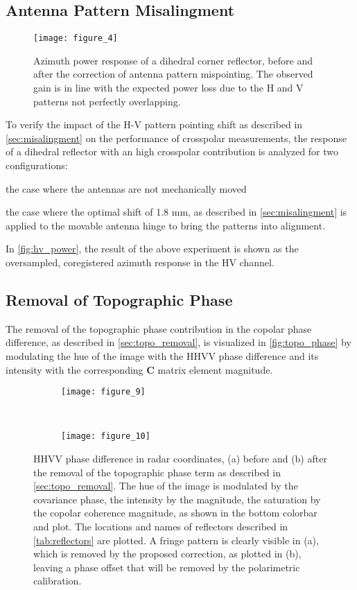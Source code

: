 \subsection{Antenna Pattern Misalingment}
\begin{figure*}[ht!]
	\centering
	\texttt{[image: figure\_4]}
	\caption{Azimuth power response of a dihedral corner reflector, before and after the correction of antenna pattern mispointing. The observed gain is in line with the expected power loss due to the H and V patterns not perfectly overlapping.}
	\label{fig:hv_power}
\end{figure*}
To verify the impact of the H-V pattern pointing shift as described in \autoref{sec:misalingment} on the performance of crosspolar measurements, the response of a dihedral reflector with an high crosspolar contribution is analyzed for two configurations:\\ \begin{enumerate*}\item the case where the antennas are not mechanically moved \item the case where the optimal shift of 1.8 mm, as described in \autoref{sec:misalingment} is applied to the movable antenna hinge to bring the patterns into alignment.\\ 
\end{enumerate*}
In \autoref{fig:hv_power}, the result of the above experiment is shown as the oversampled, coregistered azimuth response in the HV channel.
\subsection{Removal of Topographic Phase}\label{sec:topo_removal}
The removal of the topographic phase contribution in the copolar phase difference, as described in \autoref{sec:topo_removal}, is visualized in  \autoref{fig:topo_phase} by modulating the hue of the image with the HHVV phase difference and its intensity with the corresponding $\mathbf{C}$ matrix element magnitude. 
\begin{figure*}[hb]
	\centering
	\begin{subfigure}[t]{0.5\textwidth}
	\centering
	\texttt{[image: figure\_9]}
	\label{fig:topo_phase:uncorrected}
	\end{subfigure}~
	\begin{subfigure}[t]{0.5\textwidth}
	\centering
	\texttt{[image: figure\_10]}
	\label{fig:topo_phase:corrected}
	\end{subfigure}
	\caption{HHVV phase difference in radar coordinates, (a) before and (b)  after the removal of the topographic phase term as described in \autoref{sec:topo_removal}. The hue of the image is modulated by the covariance phase, the intensity by the magnitude, the saturation by the copolar coherence magnitude, as shown in the bottom colorbar and plot. The locations and names of reflectors described in \autoref{tab:reflectors} are plotted. A fringe pattern is clearly visible in (a), which is removed by the proposed correction, as plotted in (b), leaving a phase offset that will be removed by the polarimetric calibration.}
	\label{fig:topo_phase}
\end{figure*}
